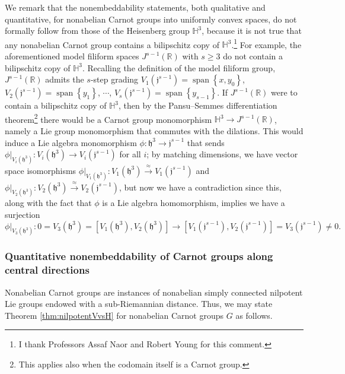\documentclass[11pt,reqno]{amsart}
\newcommand{\1}{\mathbf 1}
\begin{document}
We remark that the nonembeddability statements, both qualitative and quantitative, for nonabelian Carnot groups into uniformly convex spaces, do not formally follow from those of the Heisenberg group $\mathbb{H}^3$, because it is not true that any nonabelian Carnot group contains a bilipschitz copy of $\mathbb{H}^3$.\footnote{I thank Professors Assaf Naor and Robert Young for this comment.} For example, the aforementioned model filiform spaces $J^{s-1}\left(\mathbb{R}\right)$ with $s\ge 3$ do not contain a bilipschitz copy of $\mathbb{H}^3$. Recalling the definition of the model filiform group, $J^{s-1}\left(\mathbb{R}\right)$ admits the $s$-step grading $V_1\left(\mathfrak{j}^{s-1}\right)=\operatorname{span}\left\{x,y_0\right\}$, $V_2\left(\mathfrak{j}^{s-1}\right)=\operatorname{span}\left\{y_1\right\}$, $\cdots$, $V_s\left(\mathfrak{j}^{s-1}\right)=\operatorname{span}\left\{y_{s-1}\right\}$. If $J^{s-1}\left(\mathbb{R}\right)$ were to contain a bilipschitz copy of $\mathbb{H}^3$, then by the Pansu--Semmes differentiation theorem\footnote{This applies also when the codomain itself is a Carnot group.} there would be a Carnot group monomorphism $\mathbb{H}^3\to J^{s-1}\left(\mathbb{R}\right)$, namely a Lie group monomorphism that commutes with the dilations. This would induce a Lie algebra monomorphism $\phi:\mathfrak{h}^3\to \mathfrak{j}^{s-1}$ that sends $\left.\phi\right|_{V_i\left(\mathfrak{h}^3\right)}:V_i\left(\mathfrak{h}^3\right)\to V_i\left(\mathfrak{j}^{s-1}\right)$ for all $i$; by matching dimensions, we have vector space isomorphisms $\left.\phi\right|_{V_1\left(\mathfrak{h}^3\right)}:V_1\left(\mathfrak{h}^3\right)\stackrel{\approx}{\to} V_1\left(\mathfrak{j}^{s-1}\right)$ and $\left.\phi\right|_{V_2\left(\mathfrak{h}^3\right)}:V_2\left(\mathfrak{h}^3\right)\stackrel{\approx}{\to} V_2\left(\mathfrak{j}^{s-1}\right)$, but now we have a contradiction since this, along with the fact that $\phi$ is a Lie algebra homomorphism, implies we have a surjection
\[
\left.\phi\right|_{V_3\left(\mathfrak{h}^3\right)}:0=V_3\left(\mathfrak{h}^3\right)=\left[V_1\left(\mathfrak{h}^3\right),V_2\left(\mathfrak{h}^3\right)\right]\to \left[V_1\left(\mathfrak{j}^{s-1}\right),V_2\left(\mathfrak{j}^{s-1}\right)\right]=V_3\left(\mathfrak{j}^{s-1}\right)\neq 0.
\]

\subsubsection{Quantitative nonembeddability of Carnot groups along central directions}
Nonabelian Carnot groups are instances of nonabelian simply connected nilpotent Lie groups endowed with a sub-Riemannian distance. Thus, we may state Theorem \ref{thm:nilpotentVvsH} for nonabelian Carnot groups $G$ as follows.
\end{document}
